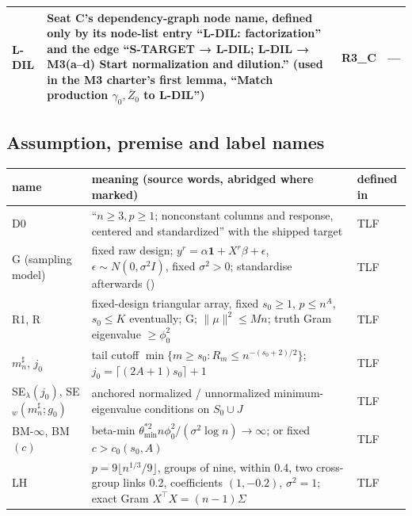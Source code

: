 {\begin{xltabular}{\linewidth}{@{}>{\raggedright\arraybackslash}p{2.1cm}>{\raggedright\arraybackslash}X>{\raggedright\arraybackslash}p{3.6cm}>{\raggedright\arraybackslash}p{3.3cm}@{}}
L-DIL & Seat C's dependency-graph node name, defined only by its node-list entry ``L-DIL: factorization'' and the edge ``S-TARGET → L-DIL; L-DIL → M3(a–d) \textbar{} Start normalization and dilution.'' (used in the M3 charter's first lemma, ``Match production $\gamma_0,\bar Z_0$ to L-DIL'') & R3\_C   & —\\
\bottomrule
\end{xltabular}
}

\subsection{Assumption, premise and label names}\label{app:notation-premises}

{\footnotesize
\begin{xltabular}{\linewidth}{@{}>{\raggedright\arraybackslash}p{2.3cm}>{\raggedright\arraybackslash}X>{\raggedright\arraybackslash}p{4.6cm}@{}}
\toprule
name & meaning (source words, abridged where marked) & defined in\\
\midrule\endhead
D0 & ``\(n\ge3,p\ge1\); nonconstant columns and response, centered and standardized'' with the shipped target & TLF \\
G (sampling model) & fixed raw design; $y^r=\alpha\mathbf1+X^r\beta+\epsilon$, $\epsilon\sim N(0,\sigma^2I)$, fixed $\sigma^2>0$; standardise afterwards () & TLF \\
R1, R & fixed-design triangular array, fixed $s_0\ge1$, $p\le n^A$, $s_0\le K$ eventually; G; $\|\mu\|^2\le Mn$; truth Gram eigenvalue $\ge\phi_0^2$ & TLF \\
$m_n^\sharp$, $j_0$ & tail cutoff $\min\{m\ge s_0:R_m\le n^{-(s_0+2)/2}\}$; $j_0=\lceil(2A+1)s_0\rceil+1$ & TLF \\
SE$_\lambda(j_0)$, SE$_w(m_n^\sharp;g_0)$ & anchored normalized / unnormalized minimum-eigenvalue conditions on $S_0\cup J$ & TLF \\
BM-$\infty$, BM$(c)$ & beta-min $\theta_{\min}^{*2}n\phi_0^2/(\sigma^2\log n)\to\infty$; or fixed $c>c_0(s_0,A)$ & TLF \\
LH & $p=9\lfloor n^{1/3}/9\rfloor$, groups of nine, within 0.4, two cross-group links 0.2, coefficients $(1,-0.2)$, $\sigma^2=1$; exact Gram $X^\top X=(n-1)\Sigma$ & TLF \\

\end{xltabular}}
